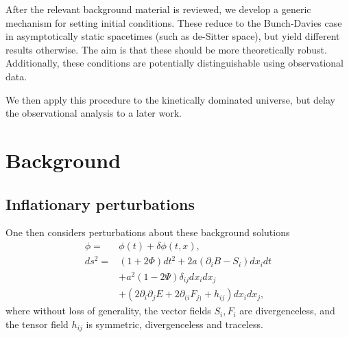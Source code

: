 After the relevant background material is reviewed, we develop a generic mechanism for setting initial conditions. These reduce to the Bunch-Davies case in asymptotically static spacetimes (such as de-Sitter space), but yield different results otherwise. The aim is that these should be more theoretically robust. Additionally, these conditions are potentially distinguishable using observational data.

We then apply this procedure to the kinetically dominated universe, but delay the observational analysis to a later work.

\section{Background}
\subsection{Inflationary perturbations}
One then considers perturbations about these background solutions 
\begin{align}
  \phi=&\phi(t) + \delta\phi(t,x),
  \label{eqn:phi_perturbation} \\
  ds^2 =& (1+2\Phi)dt^2 + 2a\left( \partial_i B-S_i \right)dx_idt \nonumber\\
  &+a^2(1-2\Psi)\delta_{ij}dx_idx_j \nonumber\\
  &+\left( 2\partial_i\partial_jE + 2\partial_{(i}F_{j)} + h_{ij} \right)dx_idx_j,
\end{align}
where without loss of generality, the vector fields $S_i,F_i$ are divergenceless, and the tensor field $h_{ij}$ is symmetric, divergenceless and traceless.

